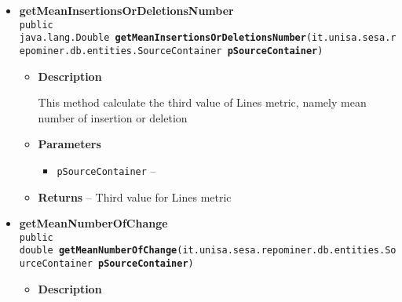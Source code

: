 {{{{{{{\begin{itemize}
{\begin{itemize}
{This method calculate ChangeSetSize metric. The ChangeSetSize metric represent mean dimension of modified files in a package
}
\item{
{\bf  Parameters}
  \begin{itemize}
   \item{
\texttt{pSourceContainer} -- }
  \end{itemize}
}%
\item{{\bf  Returns} -- 
ChangeSetSize metric value 
}%
\end{itemize}
}%
\item{ 
\hypertarget{it.unisa.sesa.repominer.metrics.PackageMetrics.getMeanInsertionsOrDeletionsNumber(it.unisa.sesa.repominer.db.entities.SourceContainer)}{{\bf  getMeanInsertionsOrDeletionsNumber}\\}
\texttt{public java.lang.Double\ {\bf  getMeanInsertionsOrDeletionsNumber}(\texttt{it.unisa.sesa.repominer.db.entities.SourceContainer} {\bf  pSourceContainer})
\label{it.unisa.sesa.repominer.metrics.PackageMetrics.getMeanInsertionsOrDeletionsNumber(it.unisa.sesa.repominer.db.entities.SourceContainer)}}%
\begin{itemize}
\item{
{\bf  Description}

This method calculate the third value of Lines metric, namely mean number of insertion or deletion
}
\item{
{\bf  Parameters}
  \begin{itemize}
   \item{
\texttt{pSourceContainer} -- }
  \end{itemize}
}%
\item{{\bf  Returns} -- 
Third value for Lines metric 
}%
\end{itemize}
}%
\item{ 
\hypertarget{it.unisa.sesa.repominer.metrics.PackageMetrics.getMeanNumberOfChange(it.unisa.sesa.repominer.db.entities.SourceContainer)}{{\bf  getMeanNumberOfChange}\\}
\texttt{public double\ {\bf  getMeanNumberOfChange}(\texttt{it.unisa.sesa.repominer.db.entities.SourceContainer} {\bf  pSourceContainer})
\label{it.unisa.sesa.repominer.metrics.PackageMetrics.getMeanNumberOfChange(it.unisa.sesa.repominer.db.entities.SourceContainer)}}%
\begin{itemize}
\item{
{\bf  Description}

}
\end{itemize}}
\end{itemize}}}}}}}}
